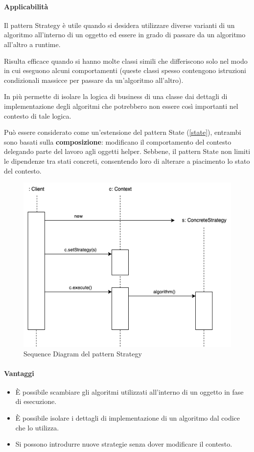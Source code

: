 \paragraph{Applicabilità} Il pattern Strategy è utile quando si desidera utilizzare diverse varianti di un algoritmo all'interno di un oggetto ed essere in grado di passare da un algoritmo all'altro a runtime.

Risulta efficace quando si hanno molte classi simili che differiscono solo nel modo in cui eseguono alcuni comportamenti (queste classi spesso contengono istruzioni condizionali massicce per passare da un'algoritmo all'altro).

In più permette di isolare la logica di business di una classe dai dettagli di implementazione degli algoritmi che potrebbero non essere così importanti nel contesto di tale logica.

Può essere considerato come un'estensione del pattern State (\ref{state}), entrambi sono basati sulla \textbf{composizione}: modificano il comportamento del contesto delegando parte del lavoro agli oggetti helper. Sebbene, il pattern State non limiti le dipendenze tra stati concreti, consentendo loro di alterare a piacimento lo stato del contesto.

\begin{figure}[H]
    \centering
    \includegraphics[width=0.7\linewidth]{assets/pattern/strategy/strategy-sequence.drawio.png}
    \caption{Sequence Diagram del pattern Strategy}
\end{figure}

\paragraph{Vantaggi}
\begin{itemize}
    \item È possibile scambiare gli algoritmi utilizzati all'interno di un oggetto in fase di esecuzione.
    \item È possibile isolare i dettagli di implementazione di un algoritmo dal codice che lo utilizza.
    \item Si possono introdurre nuove strategie senza dover modificare il contesto.
\end{itemize}

